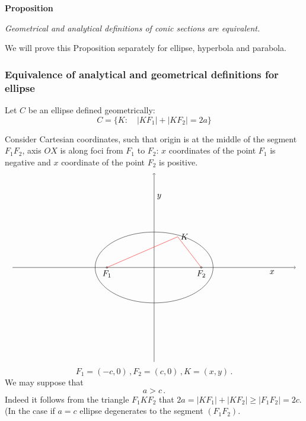 \documentclass[12pt]{article}
\numberwithin{equation}{section}
\begin{document}
{\bf Proposition}

{\it Geometrical and analytical definitions of conic
sections are equivalent.
}

We will prove this Proposition separately for ellipse, hyperbola
and parabola.

\subsubsection {Equivalence of analytical and 
geometrical definitions for ellipse}\label{equivofdefforellipse}



Let $C$ be an ellipse defined geometrically:
         \begin{equation}\label{geomellipse2}
C=\{K\colon\quad |KF_1|+|KF_2|=2a\}
           \end{equation}

Consider Cartesian coordinates, such that
origin is at the middle of the segment $F_1F_2$,
axis $OX$ is along foci from $F_1$ to $F_2$:
$x$ coordinates of  the point $F_1$ is negative and 
$x$ coordinate of the point $F_2$ is positive.
   \begin{equation*}
    \begin{tikzpicture}

   \draw       [->] (-6,0)--(0,0)--(6,0); 
   \draw       [->] (0,-4)--(0,0)--(0,4); 
 \node [below] at (5,0)   {$x$};    
 \node  [right] at (0,3) {$y$};    
\draw (-2,0) circle (1pt);
\node [below] at (-2,0) {$F_1$}; 
\draw (2,0) circle (1pt);
\node [below] at (2,0) {$F_2$}; 

\draw (0,0) ellipse  (2.5 and 1.5);

\draw [red] (-2,0)--(1,1.3)--(2,0);
\node [right] at (1,1.3) {$K$};
\end{tikzpicture} 
     \end{equation*} 
      $$
F_1=(-c,0)\,, F_2=(c,0)\,,  K=(x,y)\,.
      $$
We may suppose that
    \begin{equation}\label{ellipseinequality}
        a>c\,.
    \end{equation}
     Indeed it follows from the triangle $F_1KF_2$ that
$2a=|KF_1|+|KF_2|\geq |F_1F_2|=2c$.
(In the case if $a=c$ ellipse degenerates to the segment
$(F_1F_2)$.
\end{document}
